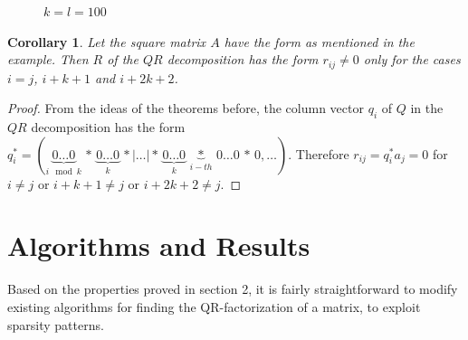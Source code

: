 \documentclass{article}
\numberwithin{pic}{section}
\numberwithin{lem}{section}
\numberwithin{thm}{section}
\newtheorem{cor}{Corollary}
\numberwithin{cor}{section}
\theoremstyle{definition}
\numberwithin{ex}{section}
\numberwithin{defn}{section}
\theoremstyle{definition}
\theoremstyle{remark}
\newlength\tindent
\renewcommand{\indent}{\hspace*{\tindent}}
\begin{document}
\begin{figure}[H] 

    \caption{$k=l=100$ }
\end{figure} 
\begin{cor}
Let the square matrix $A$ have the form as mentioned in the example. 
Then $R$ of the $QR$ decomposition has the form $r_{ij}\neq 0$ only for the cases $i=j$, $i+k+1$ and $i+2k+2$.
\end{cor}
\begin{proof}
From the ideas of the theorems before, the column vector $q_i$ of $Q$ in the $QR$ decomposition has the form $q_i^*=(\underbrace{0\dots0}_{i\mod k}\,*\,\underbrace{0\dots0}_{k }\,*|\dots|*\,\underbrace{0\dots0}_{k}\,\underbrace{*}_{i-th}\,0\dots0\,*\,0,\dots)$.
Therefore $r_{ij}= q_i^* a_j=0$ for $i\neq j$ or $i+k+1\neq j$ or $i+2k+2\neq j$.
\end{proof}
\section{Algorithms and Results}
\indent Based on the properties proved in section 2, it is fairly straightforward
to modify existing algorithms for finding the QR-factorization of a matrix, to
exploit sparsity patterns.
\end{document}
